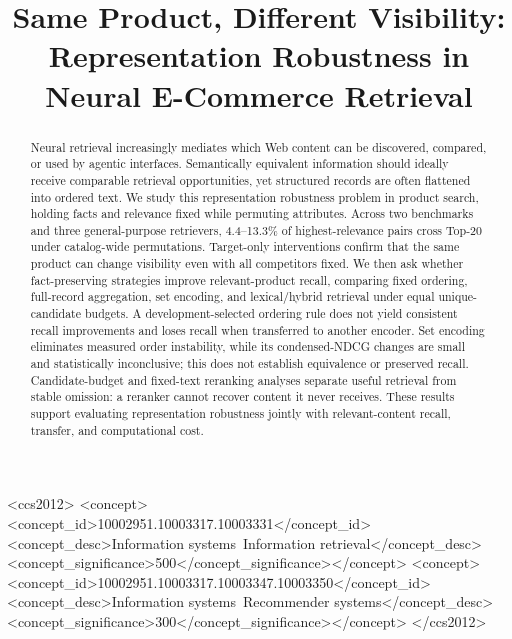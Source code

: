\documentclass[sigconf,anonymous,review]{acmart}
\title{Same Product, Different Visibility: Representation Robustness in Neural E-Commerce Retrieval}
\begin{document}
\raggedbottom
\begin{abstract}
Neural retrieval increasingly mediates which Web content can be discovered, compared, or used by agentic interfaces. Semantically equivalent information should ideally receive comparable retrieval opportunities, yet structured records are often flattened into ordered text. We study this representation robustness problem in product search, holding facts and relevance fixed while permuting attributes. Across two benchmarks and three general-purpose retrievers, 4.4--13.3\% of highest-relevance pairs cross Top-20 under catalog-wide permutations. Target-only interventions confirm that the same product can change visibility even with all competitors fixed. We then ask whether fact-preserving strategies improve relevant-product recall, comparing fixed ordering, full-record aggregation, set encoding, and lexical/hybrid retrieval under equal unique-candidate budgets. A development-selected ordering rule does not yield consistent recall improvements and loses recall when transferred to another encoder. Set encoding eliminates measured order instability, while its condensed-NDCG changes are small and statistically inconclusive; this does not establish equivalence or preserved recall. Candidate-budget and fixed-text reranking analyses separate useful retrieval from stable omission: a reranker cannot recover content it never receives. These results support evaluating representation robustness jointly with relevant-content recall, transfer, and computational cost.
\end{abstract}

\begin{CCSXML}
<ccs2012>
 <concept><concept_id>10002951.10003317.10003331</concept_id><concept_desc>Information systems~Information retrieval</concept_desc><concept_significance>500</concept_significance></concept>
 <concept><concept_id>10002951.10003317.10003347.10003350</concept_id><concept_desc>Information systems~Recommender systems</concept_desc><concept_significance>300</concept_significance></concept>
</ccs2012>
\end{CCSXML}

\maketitle









\clearpage



\end{document}
